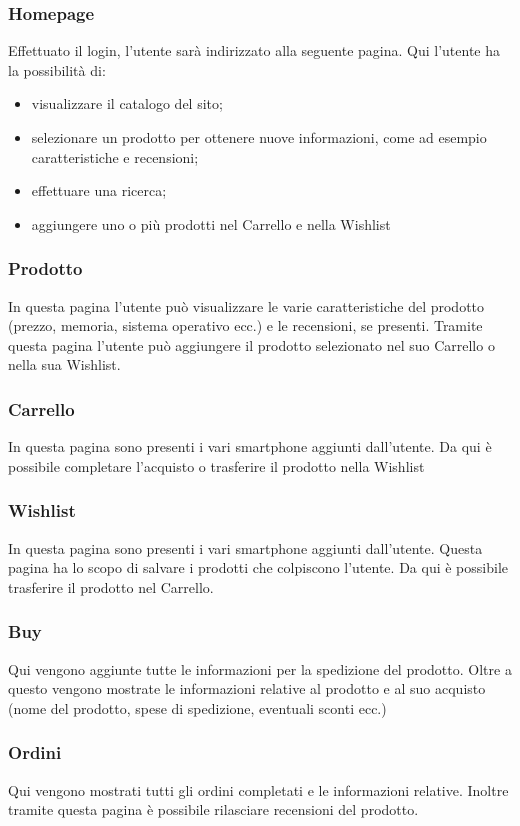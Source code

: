 \documentclass[14pt]{extarticle}
\begin{document}
\subsubsection{Homepage}
Effettuato il login, l'utente sarà indirizzato alla seguente pagina. Qui l'utente ha la
possibilità di:
\begin{itemize}
    \item  visualizzare il catalogo del sito;
    \item selezionare un prodotto per ottenere nuove informazioni, come ad esempio caratteristiche e recensioni;
    \item effettuare una ricerca;
    \item aggiungere uno o più prodotti nel Carrello e nella Wishlist
\end{itemize}

\subsubsection{Prodotto}
In questa pagina l'utente può visualizzare le varie caratteristiche del prodotto (prezzo,
memoria, sistema operativo ecc.) e le recensioni, se presenti. Tramite questa pagina l'utente
può aggiungere il prodotto selezionato nel suo Carrello o nella sua Wishlist.

\subsubsection{Carrello}
In questa pagina sono presenti i vari smartphone aggiunti dall'utente. Da qui è
possibile completare l'acquisto o trasferire il prodotto nella Wishlist

\subsubsection{Wishlist}
In questa pagina sono presenti i vari smartphone aggiunti dall'utente. Questa pagina
ha lo scopo di salvare i prodotti che colpiscono l'utente. Da qui è possibile trasferire il prodotto
nel Carrello.
\subsubsection{Buy}
Qui vengono aggiunte tutte le informazioni per la spedizione del prodotto. Oltre a questo
vengono mostrate le informazioni relative al prodotto e al suo acquisto (nome del prodotto,
spese di spedizione, eventuali sconti ecc.)

\subsubsection{Ordini}
Qui vengono mostrati tutti gli ordini completati e le informazioni relative.
 Inoltre tramite questa pagina è possibile rilasciare recensioni del prodotto.
\end{document}

